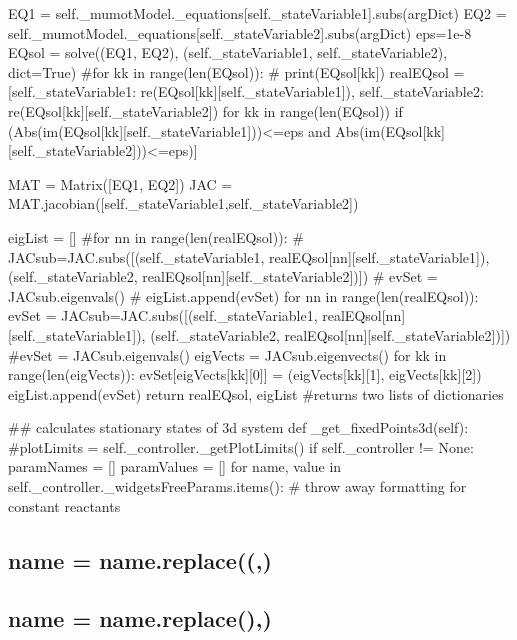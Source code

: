 \begin{DoxyVerb}    EQ1 = self._mumotModel._equations[self._stateVariable1].subs(argDict)
    EQ2 = self._mumotModel._equations[self._stateVariable2].subs(argDict)
    eps=1e-8
    EQsol = solve((EQ1, EQ2), (self._stateVariable1, self._stateVariable2), dict=True)
    #for kk in range(len(EQsol)):
    #    print(EQsol[kk])
    realEQsol = [{self._stateVariable1: re(EQsol[kk][self._stateVariable1]), self._stateVariable2: re(EQsol[kk][self._stateVariable2])} for kk in range(len(EQsol)) if (Abs(im(EQsol[kk][self._stateVariable1]))<=eps and Abs(im(EQsol[kk][self._stateVariable2]))<=eps)]

    MAT = Matrix([EQ1, EQ2])
    JAC = MAT.jacobian([self._stateVariable1,self._stateVariable2])

    eigList = []
    #for nn in range(len(realEQsol)): 
    #    JACsub=JAC.subs([(self._stateVariable1, realEQsol[nn][self._stateVariable1]), (self._stateVariable2, realEQsol[nn][self._stateVariable2])])
    #    evSet = JACsub.eigenvals()
    #    eigList.append(evSet)
    for nn in range(len(realEQsol)): 
        evSet = {}
        JACsub=JAC.subs([(self._stateVariable1, realEQsol[nn][self._stateVariable1]), (self._stateVariable2, realEQsol[nn][self._stateVariable2])])
        #evSet = JACsub.eigenvals()
        eigVects = JACsub.eigenvects()
        for kk in range(len(eigVects)):
            evSet[eigVects[kk][0]] = (eigVects[kk][1], eigVects[kk][2])
        eigList.append(evSet)
    return realEQsol, eigList #returns two lists of dictionaries

## calculates stationary states of 3d system
def _get_fixedPoints3d(self):
    #plotLimits = self._controller._getPlotLimits()
    if self._controller != None:
        paramNames = []
        paramValues = []
        for name, value in self._controller._widgetsFreeParams.items():
            # throw away formatting for constant reactants
\end{DoxyVerb}
 \subsection*{name = name.\+replace(\textquotesingle{}(\textquotesingle{},\textquotesingle{}\textquotesingle{})}

\subsection*{name = name.\+replace(\textquotesingle{})\textquotesingle{},\textquotesingle{}\textquotesingle{})}

